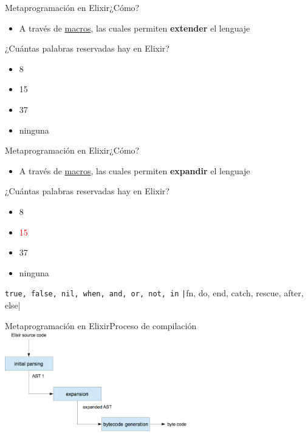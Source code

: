 \documentclass[14pt,aspectratio=169]{beamer}
\begin{document}
\begin{frame}{Metaprogramación en Elixir}{¿Cómo?}
  \begin{itemize}
    \item A través de \underline{macros}, las cuales permiten \textbf{extender}
    el lenguaje
  \end{itemize}
  \begin{block}{¿Cuántas palabras reservadas hay en Elixir?}
    \begin{itemize}
      \item 8
      \item 15
      \item 37
      \item ninguna
    \end{itemize}
  \end{block}
\end{frame}

\begin{frame}{Metaprogramación en Elixir}{¿Cómo?}
  \begin{itemize}
    \item A través de \underline{macros}, las cuales permiten \textbf{expandir}
    el lenguaje
  \end{itemize}
  \begin{block}{¿Cuántas palabras reservadas hay en Elixir?}
    \begin{itemize}
      \item 8
      \item \textcolor{red}{15}
      \item 37
      \item ninguna
    \end{itemize}
    \texttt{true, false, nil, when, and, or, not, in}
    \texttt|fn, do, end, catch, rescue, after, else|
  \end{block}
\end{frame}

\begin{frame}{Metaprogramación en Elixir}{Proceso de compilación}
  \centering
  \includegraphics[width=0.6\textwidth]{compilation_process.png}
\end{frame}
\end{document}
